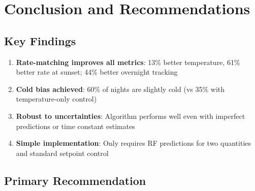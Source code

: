 \documentclass[11pt,letterpaper]{article}
\begin{document}
\section{Conclusion and Recommendations}

\subsection{Key Findings}

\begin{enumerate}
    \item \textbf{Rate-matching improves all metrics}: 13\% better temperature, 61\% better rate at sunset; 44\% better overnight tracking

    \item \textbf{Cold bias achieved}: 60\% of nights are slightly cold (vs 35\% with temperature-only control)

    \item \textbf{Robust to uncertainties}: Algorithm performs well even with imperfect predictions or time constant estimates

    \item \textbf{Simple implementation}: Only requires RF predictions for two quantities and standard setpoint control
\end{enumerate}

\subsection{Primary Recommendation}

\begin{center}
\end{center}
\end{document}
